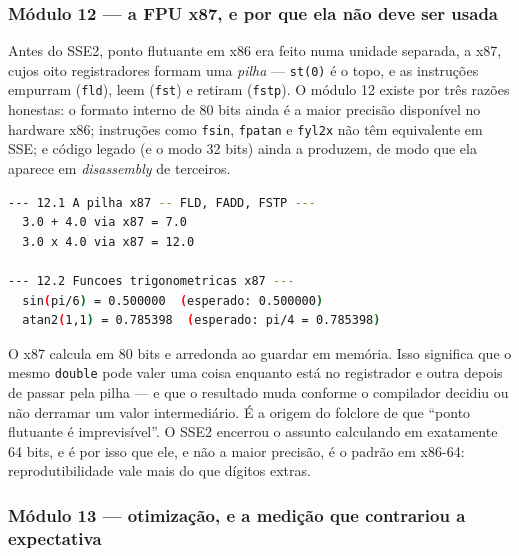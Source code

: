 \subsubsection{Módulo 12 --- a FPU x87, e por que ela não deve ser usada}

Antes do SSE2, ponto flutuante em x86 era feito numa unidade separada, a x87,
cujos oito registradores formam uma \emph{pilha} --- \texttt{st(0)} é o topo, e
as instruções empurram (\texttt{fld}), leem (\texttt{fst}) e retiram
(\texttt{fstp}). O módulo 12 existe por três razões honestas: o formato interno
de 80 bits ainda é a maior precisão disponível no hardware x86; instruções como
\texttt{fsin}, \texttt{fpatan} e \texttt{fyl2x} não têm equivalente em SSE; e
código legado (e o modo 32 bits) ainda a produzem, de modo que ela aparece em
\emph{disassembly} de terceiros.

\begin{lstlisting}[style=bt, language=bash,
    caption={Saída medida de \texttt{dist/bin/asm\_12\_fp\_x87}.}]
--- 12.1 A pilha x87 -- FLD, FADD, FSTP ---
  3.0 + 4.0 via x87 = 7.0
  3.0 x 4.0 via x87 = 12.0

--- 12.2 Funcoes trigonometricas x87 ---
  sin(pi/6) = 0.500000  (esperado: 0.500000)
  atan2(1,1) = 0.785398  (esperado: pi/4 = 0.785398)
\end{lstlisting}

\begin{armadilha}
O x87 calcula em 80 bits e arredonda ao guardar em memória. Isso significa que
o mesmo \texttt{double} pode valer uma coisa enquanto está no registrador e
outra depois de passar pela pilha --- e que o resultado muda conforme o
compilador decidiu ou não derramar um valor intermediário. É a origem do
folclore de que ``ponto flutuante é imprevisível''. O SSE2 encerrou o assunto
calculando em exatamente 64 bits, e é por isso que ele, e não a maior precisão,
é o padrão em x86-64: reprodutibilidade vale mais do que dígitos extras.
\end{armadilha}

\subsubsection{Módulo 13 --- otimização, e a medição que contrariou a expectativa}

